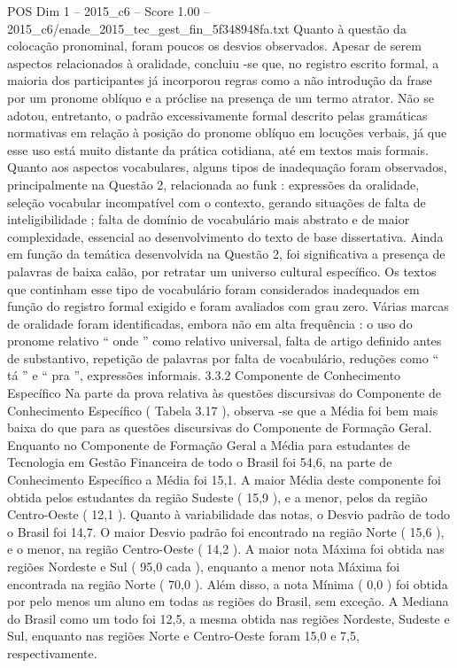 \begin{textsample}{POS Dim 1 – 2015\_c6 – Score 1.00 – 2015\_c6/enade\_2015\_tec\_gest\_fin\_5f348948fa.txt}
Quanto à questão da colocação pronominal, foram poucos os desvios observados.
Apesar de serem aspectos relacionados à oralidade, concluiu -se que, no registro escrito formal, a maioria dos participantes já incorporou regras como a não introdução da frase por um pronome oblíquo e a próclise na presença de um termo atrator.
Não se adotou, entretanto, o padrão excessivamente formal descrito pelas gramáticas normativas em relação à posição do pronome oblíquo em locuções verbais, já que esse uso está muito distante da prática cotidiana, até em textos mais formais.
Quanto aos aspectos vocabulares, alguns tipos de inadequação foram observados, principalmente na Questão 2, relacionada ao funk : expressões da oralidade, seleção vocabular incompatível com o contexto, gerando situações de falta de inteligibilidade ; falta de domínio de vocabulário mais abstrato e de maior complexidade, essencial ao desenvolvimento do texto de base dissertativa.
Ainda em função da temática desenvolvida na Questão 2, foi significativa a presença de palavras de baixa calão, por retratar um universo cultural específico.
Os textos que continham esse tipo de vocabulário foram considerados inadequados em função do registro formal exigido e foram avaliados com grau zero.
Várias marcas de oralidade foram identificadas, embora não em alta frequência : o uso do pronome relativo “ onde ” como relativo universal, falta de artigo definido antes de substantivo, repetição de palavras por falta de vocabulário, reduções como “ tá ” e “ pra ”, expressões informais. 3.3.2 Componente de Conhecimento Específico Na parte da prova relativa às questões discursivas do Componente de Conhecimento Específico ( Tabela 3.17 ), observa -se que a Média foi bem mais baixa do que para as questões discursivas do Componente de Formação Geral.
Enquanto no Componente de Formação Geral a Média para estudantes de Tecnologia em Gestão Financeira de todo o Brasil foi 54,6, na parte de Conhecimento Específico a Média foi 15,1.
A maior Média deste componente foi obtida pelos estudantes da região Sudeste ( 15,9 ), e a menor, pelos da região Centro-Oeste ( 12,1 ).
Quanto à variabilidade das notas, o Desvio padrão de todo o Brasil foi 14,7.
O maior Desvio padrão foi encontrado na região Norte ( 15,6 ), e o menor, na região Centro-Oeste ( 14,2 ).
A maior nota Máxima foi obtida nas regiões Nordeste e Sul ( 95,0 cada ), enquanto a menor nota Máxima foi encontrada na região Norte ( 70,0 ).
Além disso, a nota Mínima ( 0,0 ) foi obtida por pelo menos um aluno em todas as regiões do Brasil, sem exceção.
A Mediana do Brasil como um todo foi 12,5, a mesma obtida nas regiões Nordeste, Sudeste e Sul, enquanto nas regiões Norte e Centro-Oeste foram 15,0 e 7,5, respectivamente.

\end{textsample}

